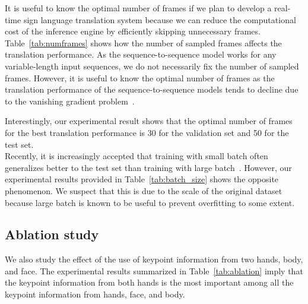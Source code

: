 \documentclass[10pt,twocolumn,letterpaper]{article}
\begin{document}
It is useful to know the optimal number of frames if we plan to develop a real-time sign language translation system because we can reduce the computational cost of the inference engine by efficiently skipping unnecessary frames.
Table~\ref{tab:numframes} shows how the number of sampled frames affects the translation performance. As the sequence-to-sequence model works for any variable-length input sequences, we do not necessarily fix the number of sampled frames. However, it is useful to know the optimal number of frames as the translation performance of the sequence-to-sequence models tends to decline due to the vanishing gradient problem~\cite{PascanuMB13}. 

Interestingly, our experimental result shows that the optimal number of frames for the best translation performance is 30 for the validation set and 50 for the test set. 
\\

Recently, it is increasingly accepted that training with small batch often generalizes better to the test set than training with large batch~\cite{HofferHS17,SmithKL17}. However, our experimental results provided in
Table~\ref{tab:batch_size} shows the opposite phenomenon. We suspect that this is due to the scale of the original dataset because large batch is known to be useful to prevent 
overfitting to some extent.

\subsection{Ablation study}

We also study the effect of the use of keypoint information from two hands, body, and face. The experimental results summarized in Table~\ref{tab:ablation} imply that the keypoint information from both hands is the most important among all the keypoint information from hands, face, and body. 

\begin{table}[H]
\caption{Ablation study on the contributions of keypoints from body, face, and hands. The results are obtained on the test set.}
\label{tab:ablation}
\end{table}
\end{document}
